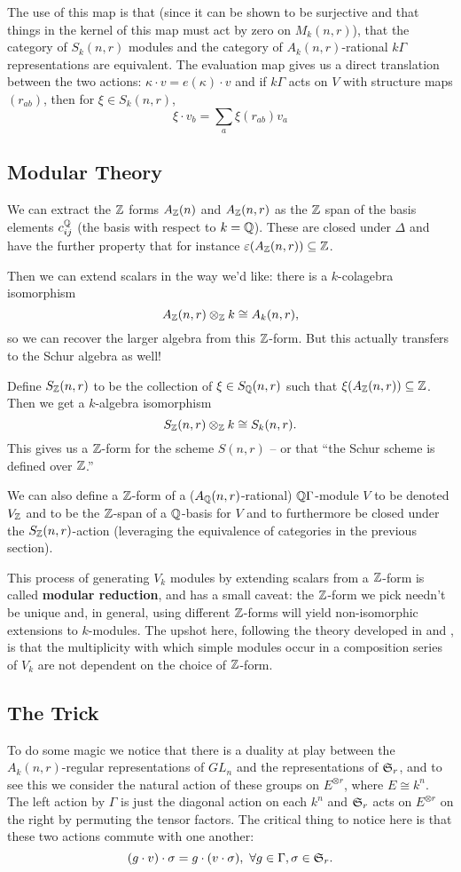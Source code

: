 \documentclass[12pt]{article}
\DeclareMathOperator{\1}{\mathbbm{1}}
\begin{document}
The use of this map is that (since it can be shown to be surjective and that things in the kernel of this map must act by zero on $M_k(n,r)$), that the category
of $S_k(n,r)$ modules and the category of $A_k(n,r)$-rational $k\Gamma$ representations are equivalent. The evaluation map gives us a direct translation between 
the two actions: $\kappa\cdot v=e(\kappa)\cdot v$ and if $k\Gamma$ acts on $V$ with structure maps $(r_{ab})$, then for $\xi\in S_k(n,r)$,
\[\xi\cdot v_b=\sum_a \xi(r_{ab})v_a\]

\subsection{Modular Theory}
We can extract the $\mathbb{Z}$ forms $A_{\mathbb{Z}}(n)$ and $A_{\mathbb{Z}}(n,r)$ as the $\mathbb{Z}$ span of the basis elements $c_{ij}^{\mathbb{Q}}$ (the basis with respect to $k=\mathbb{Q}$). These 
are closed under $\Delta$ and have the further property that for instance $\varepsilon(A_{\mathbb{Z}}(n,r))\subseteq\mathbb{Z}$.

Then we can extend scalars in the way we'd like: there is a $k$-colagebra isomorphism 
\[A_{\mathbb{Z}}(n,r)\otimes_{\mathbb{Z}} k\cong A_k(n,r),\] 
so we can recover the larger algebra from this $\mathbb{Z}$-form. But this actually transfers to the Schur algebra as well!

Define $S_{\mathbb{Z}}(n,r)$ to be the collection of $\xi\in S_{\mathbb{Q}}(n,r)$ such that $\xi(A_{\mathbb{Z}}(n,r))\subseteq\mathbb{Z}$. Then we get a $k$-algebra isomorphism
\[S_{\mathbb{Z}}(n,r)\otimes_{\mathbb{Z}} k\cong S_k(n,r).\]
This gives us a $\mathbb{Z}$-form for the scheme $S(n,r)$ -- or that ``the Schur scheme is defined over $\mathbb{Z}$.''

We can also define a $\mathbb{Z}$-form of a ($A_{\mathbb{Q}}(n,r)$-rational) $\mathbb{Q}\Gamma$-module $V$ to be denoted $V_{\mathbb{Z}}$ and to be the $\mathbb{Z}$-span of a $\mathbb{Q}$-basis for $V$
and to furthermore be closed under the $S_{\mathbb{Z}}(n,r)$-action (leveraging the equivalence of categories in the previous section).

This process of generating $V_k$ modules by extending scalars from a $\mathbb{Z}$-form is called \textbf{modular reduction}, and has a small caveat:
the $\mathbb{Z}$-form we pick needn't be unique and, in general, using different $\mathbb{Z}$-forms will yield non-isomorphic extensions to $k$-modules. The upshot here,
following the theory developed in \cite{brauer} and \cite{green-locFinReps}, is that the multiplicity with which simple modules occur in a composition series of $V_k$
are not dependent on the choice of $\mathbb{Z}$-form.

\subsection{The Trick}
To do some magic we notice that there is a duality at play between the $A_k(n,r)$-regular representations of $GL_n$ and the representations of $\mathfrak{S}_r$, 
and to see this we consider the natural action of these groups on $E^{\otimes r}$, where $E\cong k^n$. The left action by $\Gamma$ is just the diagonal action 
on each $k^n$ and $\mathfrak{S}_r$ acts on $E^{\otimes r}$ on the right by permuting the tensor factors. The critical thing to notice here is that these two 
actions commute with one another:
\[(g\cdot v)\cdot\sigma=g\cdot(v\cdot\sigma),\ \forall g\in\Gamma, \sigma\in\frakS_r.\]
\end{document}

